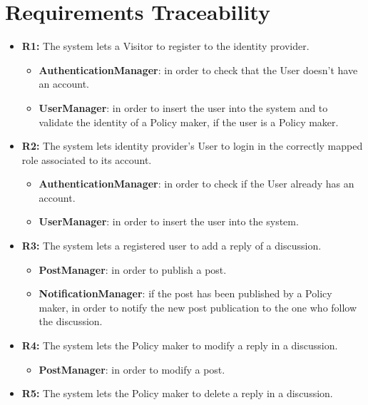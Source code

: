 \section{Requirements Traceability}
\begin{itemize}
\item \textbf{R1:} The system lets a Visitor to register to the identity provider.

\begin{itemize}
    \item \textbf{AuthenticationManager}: in order to check that the User doesn't have an account.
    \item \textbf{UserManager}: in order to insert the user into the system and to validate the identity of a Policy maker, if the user is a Policy maker.
\end{itemize}

\item \textbf{R2:} The system lets identity provider's User to login in the correctly mapped role associated to its account.

\begin{itemize}
    \item \textbf{AuthenticationManager}: in order to check if the User already has an account.
    \item \textbf{UserManager}: in order to insert the user into the system.
\end{itemize}

\item \textbf{R3:} The system lets a registered user to add a reply of a discussion.

\begin{itemize}
    \item \textbf{PostManager}: in order to publish a post.
    \item \textbf{NotificationManager}: if the post has been published by a Policy maker, in order to notify the new post publication to the one who follow the discussion.
\end{itemize}

\item \textbf{R4:} The system lets the Policy maker to modify a reply in a discussion.

\begin{itemize}
    \item \textbf{PostManager}: in order to modify a post.
\end{itemize}

\item \textbf{R5:} The system lets the Policy maker to delete a reply in a discussion.


\end{itemize}
